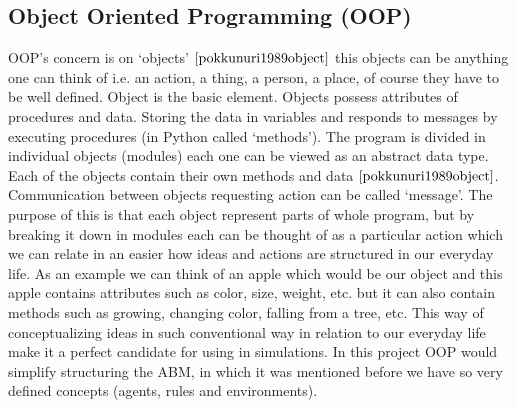 \subsection{Object Oriented Programming (OOP)} \label{OOP}
OOP's concern is on `objects' $\cite{pokkunuri1989object}$ this objects can be anything one can think of i.e. an action, a thing, a person, a place, of course they have to be well defined. Object is the basic element. Objects possess attributes of procedures and data. Storing the data in variables and responds to messages by executing procedures (in Python called ‘methods’). The program is divided in individual objects (modules) each one can be viewed as an abstract data type. Each of the objects contain their own methods and data $\cite{pokkunuri1989object}$. Communication between objects requesting action can be called ‘message’. The purpose of this is that each object represent parts of whole program, but by breaking it down in modules each can be thought of as a particular action which we can relate in an easier how ideas and actions are structured in our everyday life. As an example we can think of an apple which would be our object and this apple contains attributes such as color, size, weight, etc. but it can also contain methods such as growing, changing color, falling from a tree, etc. This way of conceptualizing ideas in such conventional way in relation to our everyday life make it a perfect candidate for using in simulations. In this project OOP would simplify structuring the ABM, in which it was mentioned before we have so very defined concepts (agents, rules and environments). 
